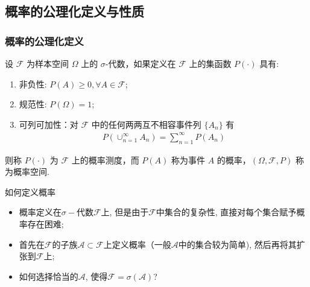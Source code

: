 


\subsection{概率的公理化定义与性质}
\begin{frame}
	\frametitle{概率的公理化定义}
	\begin{defi} 设 $\mathcal{F}$ 为样本空间 $\Omega$ 上的 $\sigma$-代数，如果定义在 $\mathcal{F}$ 上的集函数 $P (\cdot)$ 具有:
		\begin{enumerate}[<+-|alert@+>]
			\item 非负性: $P (A)\ge 0, \forall A\in \mathcal{F}$;
			\item 规范性: $P (\Omega)=1$;
			\item 可列可加性：对 $\mathcal{F}$ 中的任何两两互不相容事件列 $\{A_n\}$ 有
				\begin{eqnarray*}
					P(\cup_{n=1}^{\infty}A_n)=\sum_{n=1}^{\infty}P(A_n)
				\end{eqnarray*}
		\end{enumerate}
		\pause  则称 $P (\cdot)$ 为 $\mathcal{F}$ 上的概率测度，而 $P (A)$ 称为事件 $A$ 的概率，$(\Omega,\mathcal{F},P)$ 称为概率空间.

	\end{defi}
\end{frame}


\begin{frame}{如何定义概率}
\begin{itemize}[<+-|alert@+>]
	\item 概率定义在${\sigma-}$代数${\mathcal{F}}$上, 但是由于${\mathcal{F}}$中集合的复杂性, 直接对每个集合赋予概率存在困难;
	\item 首先在${\mathcal{F}}$的子族${\mathcal{A} \subset \mathcal{F}}$上定义概率（一般${\mathcal{A}}$中的集合较为简单), 然后再将其扩张到${\mathcal{F}}$上;%
	\item 如何选择恰当的${\mathcal{A}}$, 使得${\mathcal{F}=\sigma(\mathcal{A})}$?%
\end{itemize}




\end{frame}


